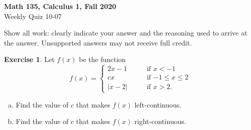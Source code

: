 \documentclass[11pt,reqno,final]{amsart}
\numberwithin{equation}{section}
\numberwithin{figure}{section}
\theoremstyle{definition} %
\newtheorem{exercise}{Exercise}
\begin{document}
\begin{center}
        \textbf{\Large Math 135, Calculus 1, Fall 2020}\\[10pt]
        {\large Weekly Quiz 10-07}
\end{center}

\thispagestyle{empty}

\renewcommand{\thesection}{\Alph{section}}

Show all work: clearly indicate your answer and the reasoning used to arrive at the answer.
Unsupported answers may not receive full credit.
$ $

\begin{exercise}
        Let $f(x)$ be the function
        \[
                f(x) = 
                \begin{cases}
                        2x-1 \qquad & \mbox{if $x<-1$}\\
                        cx & \mbox{if $-1 \leq x \leq 2$}\\
                        |x-2| & \mbox{if $x > 2$}.
                \end{cases}
        \]
        \begin{enumerate}[(a)]
        \item Find the value of $c$ that makes $f(x)$ left-continuous.
                \vfill
        \item Find the value of $c$ that makes $f(x)$ right-continuous.
                \vfill
        \end{enumerate}
\end{exercise}
\end{document}
